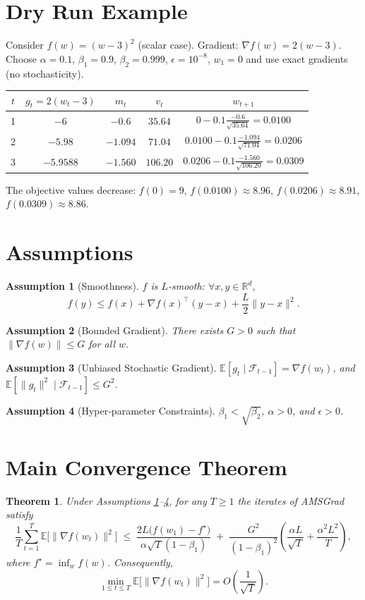 \documentclass{article}
\newtheorem{theorem}{Theorem}
\newtheorem{assumption}{Assumption}
\newcommand{\E}{\mathbb{E}}
\newcommand{\R}{\mathbb{R}}
\begin{document}
\section*{Dry Run Example}
Consider $f(w)=(w-3)^{2}$ (scalar case).  
Gradient: $\nabla f(w)=2(w-3)$.  Choose $\alpha=0.1$, $\beta_{1}=0.9$, $\beta_{2}=0.999$, $\epsilon=10^{-8}$, $w_{1}=0$ and use exact gradients (no stochasticity).

\begin{center}
\begin{tabular}{c|c|c|c|c}
$t$ & $g_{t}=2(w_{t}-3)$ & $m_{t}$ & $v_{t}$ & $w_{t+1}$\\ \hline
1 & $-6$ & $-0.6$ & $35.64$ & $0-0.1\frac{-0.6}{\sqrt{35.64}}=0.0100$\\
2 & $-5.98$ & $-1.094$ & $71.04$ & $0.0100-0.1\frac{-1.094}{\sqrt{71.04}}=0.0206$\\
3 & $-5.9588$ & $-1.560$ & $106.20$ & $0.0206-0.1\frac{-1.560}{\sqrt{106.20}}=0.0309$
\end{tabular}
\end{center}
The objective values decrease:
$f(0)=9$, $f(0.0100)\approx8.96$, $f(0.0206)\approx8.91$, $f(0.0309)\approx8.86$.

\newpage
\section*{Assumptions}
\begin{assumption}[Smoothness]\label{ass:smooth}
$f$ is $L$‑smooth: $\forall x,y\in\R^{d}$,
\[
f(y)\le f(x)+\nabla f(x)^{\top}(y-x)+\frac{L}{2}\|y-x\|^{2}.
\]
\end{assumption}
\begin{assumption}[Bounded Gradient]\label{ass:bound}
There exists $G>0$ such that $\|\nabla f(w)\|\le G$ for all $w$.
\end{assumption}
\begin{assumption}[Unbiased Stochastic Gradient]\label{ass:unbiased}
$\E[g_{t}\mid\mathcal{F}_{t-1}]=\nabla f(w_{t})$, and
$\E[\|g_{t}\|^{2}\mid\mathcal{F}_{t-1}]\le G^{2}$.
\end{assumption}
\begin{assumption}[Hyper‑parameter Constraints]\label{ass:hyper}
$\beta_{1}<\sqrt{\beta_{2}}$, $\alpha>0$, and $\epsilon>0$.
\end{assumption}

\section*{Main Convergence Theorem}
\begin{theorem}\label{thm:main}
Under Assumptions \ref{ass:smooth}–\ref{ass:hyper}, for any $T\ge1$ the iterates of AMSGrad satisfy
\[
\frac{1}{T}\sum_{t=1}^{T}\E\bigl[\|\nabla f(w_{t})\|^{2}\bigr]
\;\le\;
\frac{2L\bigl(f(w_{1})-f^{\star}\bigr)}{\alpha\sqrt{T}(1-\beta_{1})}
\;+\;
\frac{G^{2}}{(1-\beta_{1})^{2}}
\left(
\frac{\alpha L}{\sqrt{T}}+\frac{\alpha^{2}L^{2}}{T}
\right),
\]
where $f^{\star}=\inf_{w}f(w)$. Consequently,
\[
\min_{1\le t\le T}\E\bigl[\|\nabla f(w_{t})\|^{2}\bigr]=
O\!\left(\frac{1}{\sqrt{T}}\right).
\]
\end{theorem}
\end{document}
